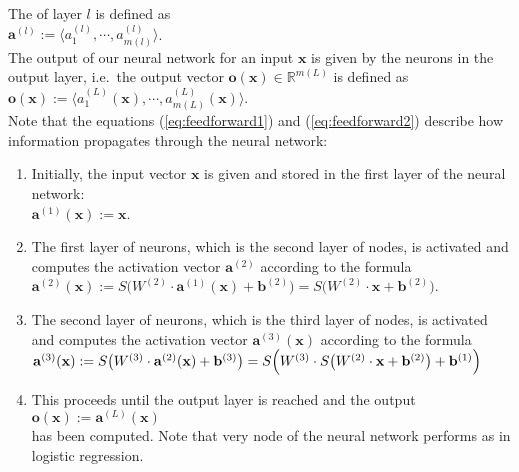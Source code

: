 The  of layer $l$ is defined as
\\[0.2cm]
\hspace*{1.3cm}
$\mathbf{a}^{(l)} := \langle a_1^{(l)}, \cdots, a_{m(l)}^{(l)} \rangle$.
\\[0.2cm]
The output of our neural network for an input $\mathbf{x}$ is given by the neurons in the output
layer,  i.e.~the output vector 
$\mathbf{o}(\mathbf{x}) \in \mathbb{R}^{m(L)}$ is defined as 
\\[0.2cm]
\hspace*{1.3cm}
$\mathbf{o}(\mathbf{x}) := \langle a^{(L)}_1(\mathbf{x}), \cdots, a^{(L)}_{m(L)}(\mathbf{x}) \rangle$.
\\[0.2cm]
Note that the equations (\ref{eq:feedforward1}) and (\ref{eq:feedforward2}) describe how information propagates
through the neural network: 
\begin{enumerate}
\item Initially, the input vector $\mathbf{x}$ is given and stored in the first layer of the neural network:
      \\[0.2cm]
      \hspace*{1.3cm}
      $\mathbf{a}^{(1)}(\mathbf{x}) := \mathbf{x}$.
\item The first layer of neurons, which is the second layer of nodes,  is activated and computes the activation
      vector $\mathbf{a}^{(2)}$ according to the formula
      \\[0.2cm]
      \hspace*{1.3cm}
      $\mathbf{a}^{(2)}(\mathbf{x}) := S\bigl(W^{(2)} \cdot \mathbf{a}^{(1)}(\mathbf{x}) + \mathbf{b}^{(2)}\bigr) = 
                                        S\bigl(W^{(2)} \cdot \mathbf{x} + \mathbf{b}^{(2)}\bigr)
      $.
\item The second layer of neurons, which is the third layer of nodes,  is activated and computes the activation
      vector $\mathbf{a}^{(3)}(\mathbf{x})$ according to the formula
      \\[0.2cm]
      \hspace*{1.3cm}
      $\mathbf{a}^{(3)}(\mathbf{x}) := S\bigl(W^{(3)} \cdot \mathbf{a}^{(2)}(\mathbf{x}) + \mathbf{b}^{(3)}\bigr)
                          = S\Bigl(W^{(3)} \cdot S\bigl(W^{(2)} \cdot \mathbf{x} + \mathbf{b}^{(2)}\bigr) + \mathbf{b}^{(1)}\Bigr)
        $
\item This proceeds until the output layer is reached and the output
      \\[0.2cm]
      \hspace*{1.3cm}
      $\mathbf{o}(\mathbf{x}) := \mathbf{a}^{(L)}(\mathbf{x})$
      \\[0.2cm]
      has been computed.  Note that very node of the neural network performs as in logistic regression.
\end{enumerate}
